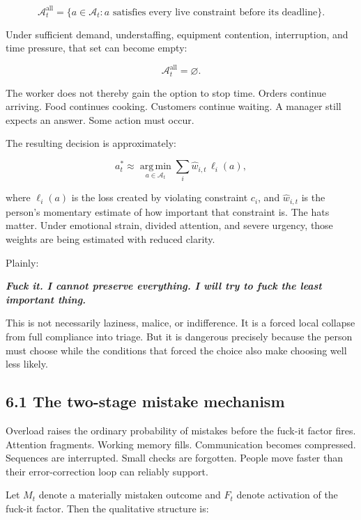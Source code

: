 \documentclass[11pt,oneside]{article}
\renewenvironment{quote}
  {\begin{tcolorbox}[
      enhanced,
      breakable,
      colback=ManifestLight,
      colframe=ManifestRule,
      boxrule=0pt,
      leftrule=3pt,
      arc=0pt,
      outer arc=0pt,
      left=10pt,right=10pt,top=8pt,bottom=8pt,
      before skip=0.8em,after skip=0.8em
    ]\itshape}
  {\end{tcolorbox}}
\begin{document}
\[
\mathcal A_t^{\mathrm{all}}
=
\{a\in\mathcal A_t : a\text{ satisfies every live constraint before its deadline}\}.
\]

Under sufficient demand, understaffing, equipment contention,
interruption, and time pressure, that set can become empty:

\[
\mathcal A_t^{\mathrm{all}}=\varnothing.
\]

The worker does not thereby gain the option to stop time. Orders
continue arriving. Food continues cooking. Customers continue waiting. A
manager still expects an answer. Some action must occur.

The resulting decision is approximately:

\[
a_t^*
\approx
\operatorname*{arg\,min}_{a\in\mathcal A_t}
\sum_i \widehat w_{i,t}\,\ell_i(a),
\]

where \(\ell_i(a)\) is the loss created by violating constraint \(c_i\),
and \(\widehat w_{i,t}\) is the person's momentary estimate of how
important that constraint is. The hats matter. Under emotional strain,
divided attention, and severe urgency, those weights are being estimated
with reduced clarity.

Plainly:

\begin{quote}
\textbf{Fuck it. I cannot preserve everything. I will try to fuck the
least important thing.}
\end{quote}

This is not necessarily laziness, malice, or indifference. It is a
forced local collapse from full compliance into triage. But it is
dangerous precisely because the person must choose while the conditions
that forced the choice also make choosing well less likely.

\subsection{6.1 The two-stage mistake
mechanism}\label{the-two-stage-mistake-mechanism}

Overload raises the ordinary probability of mistakes before the fuck-it
factor fires. Attention fragments. Working memory fills. Communication
becomes compressed. Sequences are interrupted. Small checks are
forgotten. People move faster than their error-correction loop can
reliably support.

Let \(M_t\) denote a materially mistaken outcome and \(F_t\) denote
activation of the fuck-it factor. Then the qualitative structure is:
\end{document}
